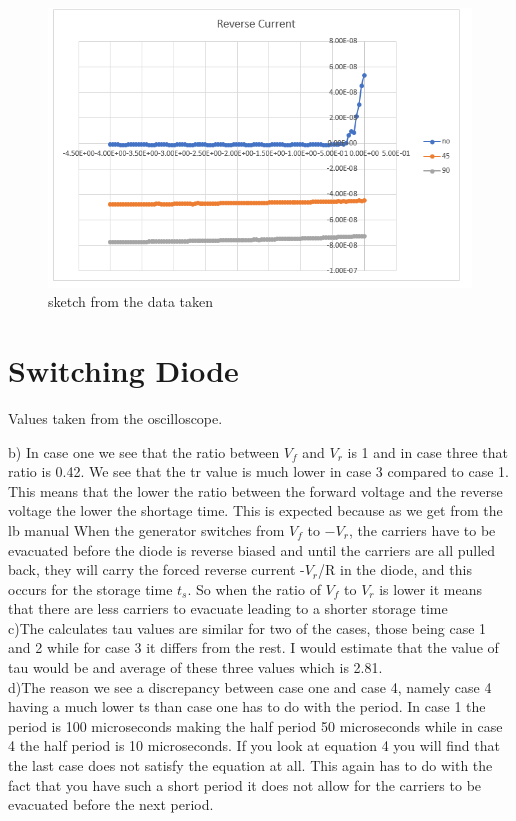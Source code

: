 \begin{figure}[H]
    \centering
    \includegraphics[width=.6\textwidth]{figures/Revese_current_sktech.png}
    \caption{sketch from the data taken}
    \label{fig:revhighlight}
\end{figure}



\section{Switching Diode}
\begin{table}[H]
    \centering
    
    \caption{Values taken from the oscilloscope.}
    \label{tab:switching}
\end{table}

b)	In case one we see that the ratio between $V_f$ and $V_r$ is 1 and in case three that ratio is 0.42. We see that the tr value is much lower in case 3 compared to case 1. This means that the lower the ratio between the forward voltage and the reverse voltage the lower the shortage time. This is expected because  as we get from the lb manual When the generator switches from $V_f$ to $-V_r$, the carriers have to be evacuated before the diode is reverse biased and until the carriers are all pulled back, they will carry the forced reverse current -$V_r$/R in the diode, and this occurs for the storage time $t_s$. So when the ratio of $V_f$ to $V_r$ is lower it means that there are less carriers to evacuate leading to a shorter storage time\\
c)The calculates tau values are similar for two of the cases, those being case 1 and 2 while for case 3 it differs from the rest. I would estimate that the value of tau would be and average of these three values which is 2.81.\\
d)The reason we see a discrepancy between case one and case 4, namely case 4 having a much lower ts than case one has to do with the period. In case 1 the period is 100 microseconds making the half period 50 microseconds while in case 4 the half period is 10 microseconds. If you look at equation 4 you will find that the last case does not satisfy the equation at all. This again has to do with the fact that you have such a short period it does not allow for the carriers to be evacuated before the next period.\\

